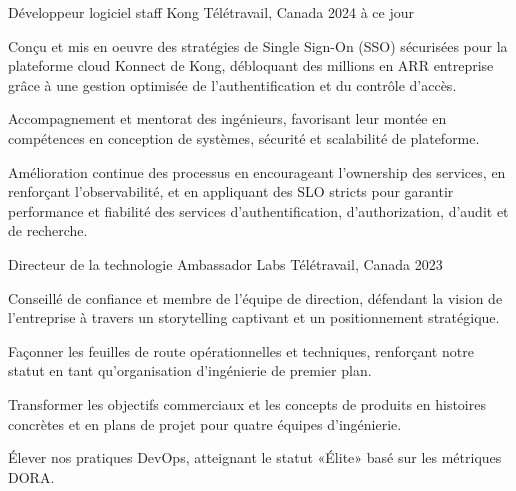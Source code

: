 
\begin{cventries}

  \cventry
    {Développeur logiciel staff} %
    {Kong} %
    {Télétravail, Canada} %
    {2024 à ce jour} %
    {
      \begin{cvitems} %
        \item {Conçu et mis en oeuvre des stratégies de Single Sign-On (SSO) sécurisées pour la plateforme cloud Konnect de Kong, débloquant des millions en ARR entreprise grâce à une gestion optimisée de l’authentification et du contrôle d’accès.}
        \item {Accompagnement et mentorat des ingénieurs, favorisant leur montée en compétences en conception de systèmes, sécurité et scalabilité de plateforme.}
        \item {Amélioration continue des processus en encourageant l’ownership des services, en renforçant l’observabilité, et en appliquant des SLO stricts pour garantir performance et fiabilité des services d'authentification, d'authorization, d'audit et de recherche.}
      \end{cvitems}
    }

  \cventry
    {Directeur de la technologie} %
    {Ambassador Labs} %
    {Télétravail, Canada} %
    {2023} %
    {
      \begin{cvitems} %
        \item {Conseillé de confiance et membre de l'équipe de direction, défendant la vision de l'entreprise à travers un storytelling captivant et un positionnement stratégique.}
        \item {Façonner les feuilles de route opérationnelles et techniques, renforçant notre statut en tant qu'organisation d'ingénierie de premier plan.}
        \item {Transformer les objectifs commerciaux et les concepts de produits en histoires concrètes et en plans de projet pour quatre équipes d'ingénierie.}
        \item {Élever nos pratiques DevOps, atteignant le statut «Élite» basé sur les métriques DORA.}
      \end{cvitems}
    }


\end{cventries}
